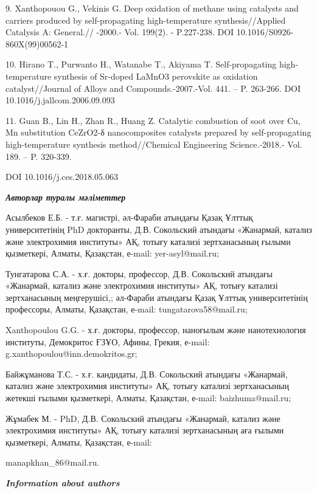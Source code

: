 \begin{noparindent}
9. Xanthopouou G., Vekinis G. Deep oxidation of methane using catalysts
and carriers produced by self-propagating high-temperature
synthesis//Applied Catalysis A: General.// -2000.- Vol. 199(2). -
P.227-238. DOI 10.1016/S0926-860X(99)00562-1

10. Hirano T., Purwanto H., Watanabe T., Akiyama T. Self-propagating
high-temperature synthesis of Sr-doped LaMnO3 perovskite as oxidation
catalyst//Journal of Alloys and Compounds.-2007.-Vol. 441. -- P.
263-266. DOI 10.1016/j.jallcom.2006.09.093

11. Guan B., Lin H., Zhan R., Huang Z. Catalytic combustion of soot over
Cu, Mn substitution CeZrO2-δ nanocomposites catalysts prepared by
self-propagating high-temperature synthesis method//Chemical Engineering
Science.-2018.- Vol. 189. -- P. 320-339.

DOI 10.1016/j.ces.2018.05.063
\end{noparindent}

\emph{{\bfseries Авторлар туралы мәліметтер}}

\begin{noparindent}
Асылбеков Е.Б. - т.ғ. магистрі, әл-Фараби атындағы Қазақ Ұлттық
университетінің PhD докторанты, Д.В. Сокольский атындағы «Жанармай,
катализ және электрохимия институты» АҚ, тотығу катализі зертханасының
ғылыми қызметкері, Алматы, Қазақстан, е-mail: yer-asyl@mail.ru;

Тунгатарова С.А. - х.ғ. докторы, профессор, Д.В. Сокольский атындағы
«Жанармай, катализ және электрохимия институты» АҚ, тотығу катализі
зертханасының меңгерушісі,; әл-Фараби атындағы Қазақ Ұлттық
университетінің профессоры, Алматы, Қазақстан, е-mail:
tungatarova58@mail.ru;

Xanthopoulou G.G. - х.ғ. докторы, профессор, наноғылым және
нанотехнология институты, Демокритос ҒЗҰО, Афины, Грекия, е-mail:
g.xanthopoulou@inn.demokritos.gr;

Байжұманова Т.С. - х.ғ. кандидаты, Д.В. Сокольский атындағы «Жанармай,
катализ және электрохимия институты» АҚ, тотығу катализі зертханасының
жетекші ғылыми қызметкері, Алматы, Қазақстан, е-mail: baizhuma@mail.ru;

Жұмабек М. - PhD, Д.В. Сокольский атындағы «Жанармай, катализ және
электрохимия институты» АҚ, тотығу катализі зертханасының аға ғылыми
қызметкері, Алматы, Қазақстан, е-mail:

manapkhan\_86@mail.ru.
\end{noparindent}

\emph{{\bfseries Information about authors}}

